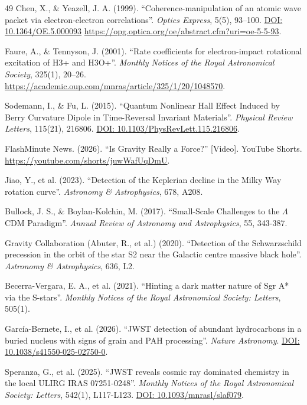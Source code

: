 \documentclass[11pt, a4paper]{article}
\newcommand{\doi}[1]{\href{https://doi.org/#1}{DOI: #1}}
\begin{document}
\begin{thebibliography}{49}
  Chen, X., \& Yeazell, J. A. (1999). ``Coherence-manipulation of an atomic wave packet via electron-electron correlations''. \textit{Optics Express}, 5(5), 93--100. 
  \doi{10.1364/OE.5.000093} \url{https://opg.optica.org/oe/abstract.cfm?uri=oe-5-5-93}.

  Faure, A., \& Tennyson, J. (2001). ``Rate coefficients for electron-impact rotational excitation of H3+ and H3O+''. \textit{Monthly Notices of the Royal Astronomical Society}, 325(1), 20–26. 
  \url{https://academic.oup.com/mnras/article/325/1/20/1048570}.

  Sodemann, I., \& Fu, L. (2015). ``Quantum Nonlinear Hall Effect Induced by Berry Curvature Dipole in Time-Reversal Invariant Materials''. \textit{Physical Review Letters}, 115(21), 216806. 
  \doi{10.1103/PhysRevLett.115.216806}.

  FlashMinute News. (2026). ``Is Gravity Really a Force?'' [Video]. YouTube Shorts. \url{https://youtube.com/shorts/juwWafUqDmU}.

  Jiao, Y., et al. (2023). ``Detection of the Keplerian decline in the Milky Way rotation curve''. \textit{Astronomy \& Astrophysics}, 678, A208.

  Bullock, J. S., \& Boylan-Kolchin, M. (2017). ``Small-Scale Challenges to the $\Lambda$CDM Paradigm''. \textit{Annual Review of Astronomy and Astrophysics}, 55, 343-387.

  Gravity Collaboration (Abuter, R., et al.) (2020). ``Detection of the Schwarzschild precession in the orbit of the star S2 near the Galactic centre massive black hole''. \textit{Astronomy \& Astrophysics}, 636, L2.

  Becerra-Vergara, E. A., et al. (2021). ``Hinting a dark matter nature of Sgr A* via the S-stars''. \textit{Monthly Notices of the Royal Astronomical Society: Letters}, 505(1).

  García-Bernete, I., et al. (2026). ``JWST detection of abundant hydrocarbons in a buried nucleus with signs of grain and PAH processing''. \textit{Nature Astronomy}. 
  \doi{10.1038/s41550-025-02750-0}.

  Speranza, G., et al. (2025). ``JWST reveals cosmic ray dominated chemistry in the local ULIRG IRAS 07251-0248''. \textit{Monthly Notices of the Royal Astronomical Society: Letters}, 542(1), L117-L123.
  \doi{10.1093/mnrasl/slaf079}.


\end{thebibliography}
\end{document}
